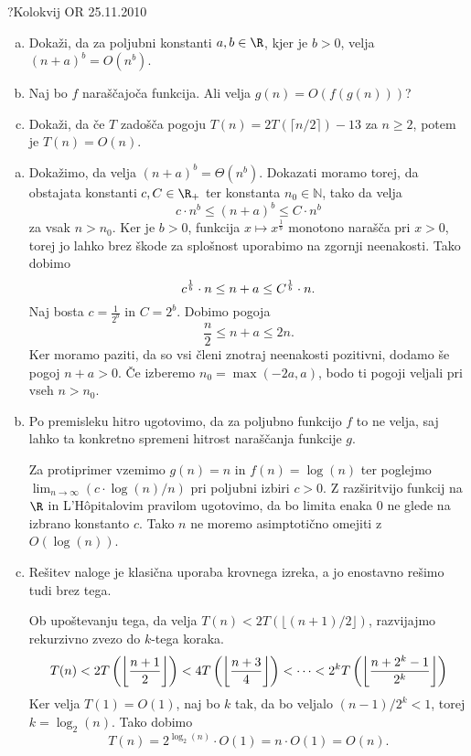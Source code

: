 \begin{naloga}{?}{Kolokvij OR 25.11.2010}
\begin{vprasanje}
\begin{enumerate}[(a)]
\item Dokaži, da za poljubni konstanti $a, b \in \R$, kjer je $b > 0$,
velja ${(n + a)}^b = O(n^b)$.

\item Naj bo $f$ naraščajoča funkcija.
Ali velja $g(n) = O(f(g(n)))$?

\item Dokaži,
da če $T$ zadošča pogoju $T(n) = 2T(\lceil n/2 \rceil) - 13$ za $n \ge 2$,
potem je $T(n) = O(n)$.
\end{enumerate}
\end{vprasanje}

\begin{odgovor}
\begin{enumerate}[(a)]
\item Dokažimo, da velja $(n + a)^b = \Theta(n^b)$.
Dokazati moramo torej,
da obstajata konstanti $c, C \in \R_+$ ter konstanta $n_0 \in \mathbb{N}$,
tako da velja
$$
c \cdot n^b \leq (n + a)^b \leq C \cdot n^b
$$
za vsak $n > n_0$.
Ker je $b > 0$,
funkcija $x \mapsto x^{\frac{1}{b}}$ monotono narašča pri $x>0$,
torej jo lahko brez škode za splošnost uporabimo na zgornji neenakosti.
Tako dobimo
$$
c^{1 \over b} \cdot n \leq n + a \leq C^{1 \over b} \cdot n.
$$
Naj bosta $c = \frac{1}{2^b}$ in $C = 2^b$.
Dobimo pogoja
$$
\frac{n}{2} \leq n + a \leq 2n .
$$
Ker moramo paziti, da so vsi členi znotraj neenakosti pozitivni,
dodamo še pogoj $n + a > 0$.
Če izberemo $n_0 = \max(-2a, a)$,
bodo ti pogoji veljali pri vseh $n > n_0$.

\item Po premisleku hitro ugotovimo, da za poljubno funkcijo $f$ to ne velja,
saj lahko ta konkretno spremeni hitrost naraščanja funkcije $g$.

Za protiprimer vzemimo $g(n) = n$ in $f(n) = \log(n)$
ter poglejmo $\lim_{n \rightarrow \infty} (c \cdot \log(n) / n)$
pri poljubni izbiri $c > 0$.
Z razširitvijo funkcij na $\R$ in L'Hôpitalovim pravilom ugotovimo,
da bo limita enaka $0$ ne glede na izbrano konstanto $c$.
Tako $n$ ne moremo asimptotično omejiti z $O(\log(n))$.

\item Rešitev naloge je klasična uporaba krovnega izreka,
a jo enostavno rešimo tudi brez tega.

Ob upoštevanju tega, da velja $T(n) < 2T(\lfloor (n+1)/2 \rfloor)$,
razvijajmo rekurzivno zvezo do $k$-tega koraka.
$$
T(n) < 2T\left(\left\lfloor{n+1 \over 2}\right\rfloor\right)
< 4T\left(\left\lfloor{n+3 \over 4}\right\rfloor\right)
< \dots < 2^k T\left(\left\lfloor{n + 2^k - 1 \over 2^k}\right\rfloor\right)
$$
Ker velja $T(1) = O(1)$, naj bo $k$ tak,
da bo veljalo $(n-1) / 2^k < 1$, torej $k = \log_2(n)$.
Tako dobimo
$$
T(n) = 2^{\log_2(n)} \cdot O(1) = n \cdot O(1) = O(n).
$$
\end{enumerate}
\end{odgovor}
\end{naloga}
